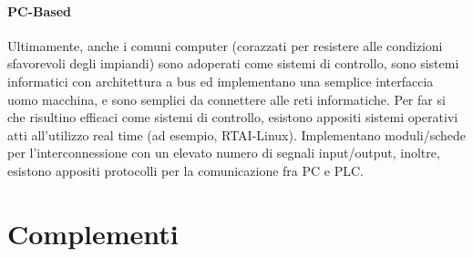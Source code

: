 \documentclass[10pt, letterpaper]{report}
\begin{document}
\subsubsection{PC-Based}
Ultimamente, anche i comuni computer (corazzati per resistere alle condizioni 
sfavorevoli degli impiandi) sono adoperati  come sistemi di controllo, sono sistemi informatici con architettura  
a bus ed implementano una semplice interfaccia uomo macchina, e sono semplici da connettere alle reti informatiche.\acc 
Per far si che risultino efficaci come sistemi di controllo, esistono appositi sistemi operativi atti 
all'utilizzo real time (ad esempio, RTAI-Linux). Implementano 
moduli/schede per l'interconnessione con un elevato numero di 
segnali input/output, inoltre, esistono appositi protocolli per la comunicazione fra PC e PLC.










\chapter{Complementi}
\end{document}
